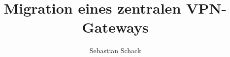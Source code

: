 \documentclass{naklatex}
\author{Sebastian Schack}
\title{Migration eines zentralen VPN-Gateways}
\begin{document}
	\begin{frontmatter}
			\maketitle
			
			\inhaltsverzeichnis
			\quellenverzeichnis
			\abbildungsverzeichnis
			\tabellenverzeichnis
			
	\end{frontmatter}
	
	\begin{mainmatter}
		
		
	\end{mainmatter}
	
	\begin{backmatter}
		
		
			\begin{anhang}
				
			\end{anhang}
	\end{backmatter}
\end{document}
